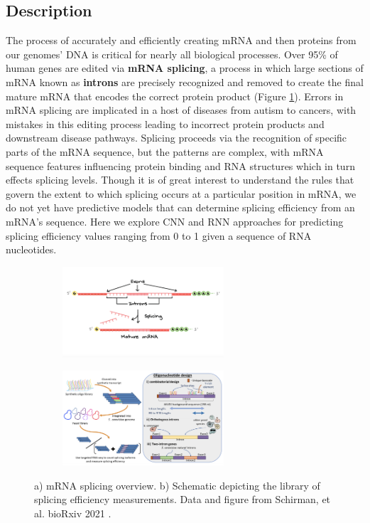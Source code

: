 \documentclass{article}
\begin{document}
\subsection{Description}
The process of accurately and efficiently creating mRNA and then proteins from our genomes' DNA is critical for nearly all biological processes. Over 95\% of human genes are edited via {\bf mRNA splicing}, a process in which large sections of mRNA known as {\bf introns} are precisely recognized and removed to create the final mature mRNA that encodes the correct protein product (Figure \ref{fig:splicing}). Errors in mRNA splicing are implicated in a host of diseases from autism to cancers, with mistakes in this editing process leading to incorrect protein products and downstream disease pathways. Splicing proceeds via the recognition of specific parts of the mRNA sequence, but the patterns are complex, with mRNA sequence features influencing protein binding and RNA structures which in turn effects splicing levels. Though it is of great interest to understand the rules that govern the extent to which splicing occurs at a particular position in mRNA, we do not yet have predictive models that can determine splicing efficiency from an mRNA's sequence. Here we explore CNN and RNN approaches for predicting splicing efficiency values ranging from 0 to 1 given a sequence of RNA nucleotides.
\begin{figure}[H]
\centering
\begin{subfigure}{.4 \textwidth}
\centering
\caption{} \includegraphics[width=6cm]{../figures/splicing_graphic.png} 
\label{fig:splicing}
\end{subfigure}
\begin{subfigure}{.5 \textwidth}
\centering
\caption{}  \includegraphics[width=6cm]{../figures/dataset_overview_pilpel.png} 
\label{fig:dataset}
\end{subfigure}
\caption{a) mRNA splicing overview. b) Schematic depicting the library of splicing efficiency measurements. Data and figure from Schirman, et al. bioRxiv 2021 \cite{pilpel}.}
\end{figure}
\end{document}
